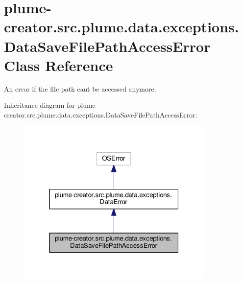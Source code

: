 \hypertarget{classplume-creator_1_1src_1_1plume_1_1data_1_1exceptions_1_1_data_save_file_path_access_error}{}\section{plume-\/creator.src.\+plume.\+data.\+exceptions.\+Data\+Save\+File\+Path\+Access\+Error Class Reference}
\label{classplume-creator_1_1src_1_1plume_1_1data_1_1exceptions_1_1_data_save_file_path_access_error}


An error if the file path can\textquotesingle{}t be accessed anymore.  




Inheritance diagram for plume-\/creator.src.\+plume.\+data.\+exceptions.\+Data\+Save\+File\+Path\+Access\+Error\+:
\nopagebreak
\begin{figure}[H]
\begin{center}
\leavevmode
\includegraphics[width=277pt]{classplume-creator_1_1src_1_1plume_1_1data_1_1exceptions_1_1_data_save_file_path_access_error__inherit__graph}
\end{center}
\end{figure}



